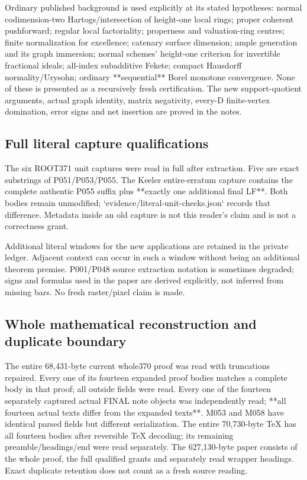\documentclass[11pt]{article}
\begin{document}
Ordinary published background is used explicitly at its stated hypotheses: normal codimension-two Hartogs/intersection of height-one local rings; proper coherent pushforward; regular local factoriality; properness and valuation-ring centres; finite normalization for excellence; catenary surface dimension; ample generation and its graph immersion; normal schemes' height-one criterion for invertible fractional ideals; all-index subadditive Fekete; compact Hausdorff normality/Urysohn; ordinary **sequential** Borel monotone convergence. None of these is presented as a recursively fresh certification. The new support-quotient arguments, actual graph identity, matrix negativity, every-D finite-vertex domination, error signs and net insertion are proved in the notes.

\subsection{Full literal capture qualifications}

The six ROOT371 unit captures were read in full after extraction. Five are exact substrings of P051/P053/P055. The Keeler entire-erratum capture contains the complete authentic P055 suffix plus **exactly one additional final LF**. Both bodies remain unmodified; `evidence/literal-unit-checks.json` records that difference. Metadata inside an old capture is not this reader's claim and is not a correctness grant.

Additional literal windows for the new applications are retained in the private ledger. Adjacent context can occur in such a window without being an additional theorem premise. P001/P048 source extraction notation is sometimes degraded; signs and formulas used in the paper are derived explicitly, not inferred from missing bars. No fresh raster/pixel claim is made.

\subsection{Whole mathematical reconstruction and duplicate boundary}

The entire 68,431-byte current whole370 proof was read with truncations repaired. Every one of its fourteen expanded proof bodies matches a complete body in that proof; all outside fields were read. Every one of the fourteen separately captured actual FINAL note objects was independently read; **all fourteen actual texts differ from the expanded texts**. M053 and M058 have identical parsed fields but different serialization. The entire 70,730-byte TeX has all fourteen bodies after reversible TeX decoding; its remaining preamble/headings/end were read separately. The 627,130-byte paper consists of the whole proof, the full qualified grants and separately read wrapper headings. Exact duplicate retention does not count as a fresh source reading.
\end{document}
